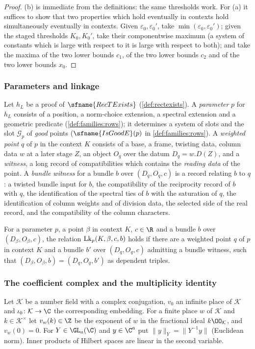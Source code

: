 \begin{proof}
(b) is immediate from the definitions: the same thresholds work. For (a) it suffices to show that two properties
which hold eventually in contexts hold simultaneously eventually in contexts. Given $\varepsilon_0,\varepsilon_0'$,
take $\min(\varepsilon_0,\varepsilon_0')$; given the staged thresholds $K_0,K_0'$, take their componentwise maximum
(a system of constants which is large with respect to it is large with respect to both); and take the maxima of the
two lower bounds $c_1$, of the two lower bounds $c_2$ and of the two lower bounds $x_0$.
\end{proof}

\subsubsection{Parameters and linkage}
Let $h_L$ be a proof of $\sfname{RecTExists}$ (\cref{def:rectexists}). A \emph{parameter} $p$ for $h_L$ consists of a
position, a norm-choice extension, a spectral extension and a geometric predicate (\cref{def:families:rows}); it
determines a system of slots and the slot $\mathcal G_p$ of \emph{good} points ($\sfname{IsGoodE}(p)$ in
\cref{def:families:rows}). A \emph{weighted point} $q$ of $p$ in the context $K$ consists of a base, a frame, twisting
data, column data $w$ at a later stage $Z$, an object $O_q$ over the datum $D_q=w.D(Z)$, and a \emph{witness}, a long
record of compatibilities which contains the \emph{reading data} of the point. A \emph{bundle witness} for a bundle $b$
over $(D_q,O_q,c)$ is a record relating $b$ to $q$: a twisted bundle input for $b$, the compatibility of the
reciprocity record of $b$ with $q$, the identification of the spectral ties of $b$ with the saturation of $q$, the
identification of column weights and of division data, the selected side of the real record, and the compatibility
of the column characters.

\begin{definition}\label{pf:open0a:def:link}
For a parameter $p$, a point $\beta$ in context $K$, $c\in\R$ and a bundle $b$ over $(D_\beta,O_\beta,c)$, the
relation $\mathrm{Lk}_p(K,\beta,c,b)$ holds if there are a weighted point $q$ of $p$ in context $K$ and a bundle $b'$
over $(D_q,O_q,c)$ admitting a bundle witness, such that $(D_\beta,O_\beta,b)=(D_q,O_q,b')$ as dependent triples.
\end{definition}

\subsubsection{The coefficient complex and the multiplicity identity}
Let $\mathcal{K}$ be a number field with a complex conjugation, $v_0$ an infinite place of $\mathcal{K}$ and
$\iota_0\colon\mathcal{K}\to\C$ the corresponding embedding. For a finite place $w$ of $\mathcal{K}$ and
$k\in\mathcal{K}^\times$ let $v_w(k)\in\Z$ be the exponent of $w$ in the fractional ideal $k\OO_{\mathcal{K}}$, and
$v_w(0)=0$. For $Y\in\GL_a(\C)$ and $y\in\C^a$ put $\|y\|_Y=\|Y^{-1}y\|$ (Euclidean norm). Inner products of Hilbert
spaces are linear in the second variable.

